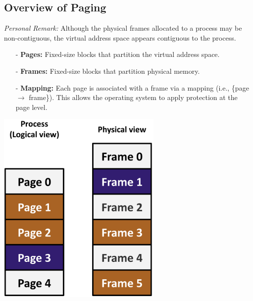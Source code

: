 \subsection{Overview of Paging}
\textit{Personal Remark:} Although the physical frames allocated to a process may be non-contiguous, the virtual address space appears contiguous to the process.\\
\noindent
\begin{minipage}{0.45\textwidth}
  \begin{itemize}
    \item[-] \textbf{Pages:} Fixed-size blocks that partition the virtual address space.
  \item[-] \textbf{Frames:} Fixed-size blocks that partition physical memory.
  \item[-] \textbf{Mapping:} Each page is associated with a frame via a mapping (i.e., \{page $\rightarrow$ frame\}). This allows the operating system to apply protection at the page level.
\end{itemize}
\end{minipage}
\hfill
\vline
\hfill
\begin{minipage}{0.45\textwidth}
\begin{center}
  \includegraphics[width=0.6\textwidth]{chapters/L5/images/page-mmu.png}
\end{center}
\end{minipage}\\
\newpage

